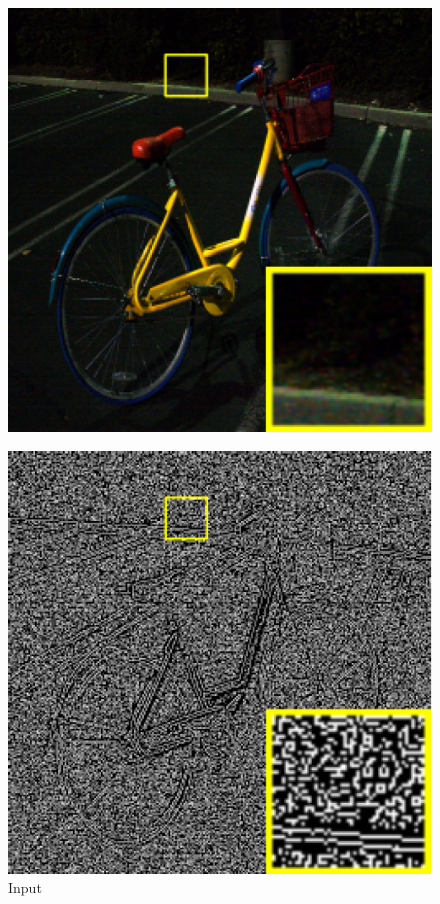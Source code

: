 \documentclass[CJK,aspectratio=169]{beamer}  %
\begin{document}
	\begin{frame}
		
		\begin{figure}
			\centering
			\begin{minipage}{.25\textwidth}
				\centering
				\includegraphics[width=.8\linewidth]{picture/LLIE/Structure Modeling and Guidance/Input}
				\captionsetup{font=scriptsize}
				\label{fig: SMG_Input}
				\caption*{Input}
			\end{minipage}
			\begin{minipage}{.25\textwidth}
				\centering
				\includegraphics[width=.8\linewidth]{picture/LLIE/Structure Modeling and Guidance/Structure of (a)}

\end{minipage}
\end{figure}
\end{frame}
\end{document}
